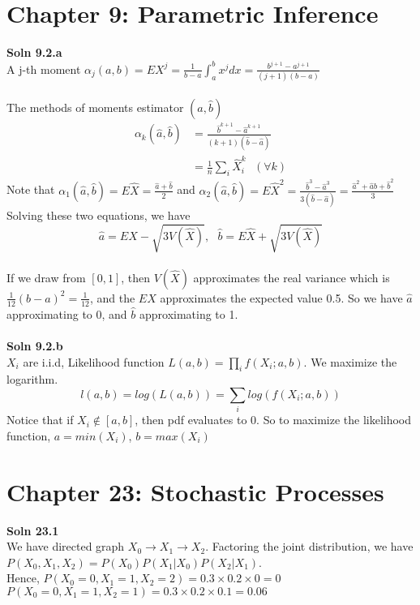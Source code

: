 \documentclass{article}
\newcommand{\SOL}[2]{%
  \textbf{Soln #1}\\%
}
\begin{document}
\section*{Chapter 9: Parametric Inference}
\SOL{9.2.a}
\\
A j-th moment $\alpha_j (a, b) = EX^j = \frac{1}{b-a}\int^b_a x^j dx = \frac{b^{j+1} - a^{j+1}}{(j+1)(b-a)}$ \\ \\
The methods of moments estimator $(\hat{a}, \hat{b})$
\begin{align*}
	\alpha_k (\hat{a}, \hat{b})&= \frac{\hat{b}^{k+1} - \hat{a}^{k+1}}{(k+1)(\hat{b} - \hat{a})} \\
	 &= \frac{1}{n} \sum_i \hat{X}^k_i \ \ \ (\forall k)
\end{align*}
Note that $\alpha_1(\hat{a}, \hat{b}) = E\hat{X}  = \frac{\hat{a}+\hat{b}}{2}$  and $\alpha_2(\hat{a}, \hat{b}) = E\hat{X}^2 = \frac{\hat{b}^3 - \hat{a}^3}{3(\hat{b} - \hat{a})} = \frac{\hat{a}^2 + \hat{a}\hat{b} + \hat{b}^2}{3}$ \\
Solving these two equations, we have  
$$
  \hat{a} = E\hat{X} - \sqrt{3V(\hat{X})}, \ \ \ \hat{b} = E\hat{X} +  \sqrt{3V(\hat{X})}
$$ \\
If we draw from $[0, 1]$, then $V(\hat{X})$ approximates the real variance which is $\frac{1}{12}(b - a)^2 = \frac{1}{12}$, and the $E\hat{X}$ approximates the expected value 0.5. So we have $\hat{a}$ approximating to 0, and $\hat{b}$ approximating to 1. \\ \\ 
\SOL{9.2.b}
\\
$X_i$ are i.i.d,  Likelihood function $L(a,b) = \prod_i f(X_i;a,b)$. We maximize the logarithm. \\
$$ l(a,b) = log(L(a,b)) = \sum_i log(f(X_i;a,b))$$
Notice that if $X_i \not\in [a, b]$, then pdf evaluates to 0. So to maximize the likelihood function,  $ a = min(X_i)$, $b=max(X_i)$

\section*{Chapter 23: Stochastic Processes}
\SOL{23.1} \\
We have directed graph $X_0 \rightarrow X_1 \rightarrow X_2$. Factoring the joint distribution, we have $P(X_0, X_1, X_2) = P(X_0) P(X_1|X_0)P(X_2|X_1)$. \\
Hence, $P(X_0=0, X_1=1, X_2 = 2) = 0.3\times 0.2 \times 0 = 0$ \\
$P(X_0=0, X_1=1, X_2 = 1) = 0.3 \times 0.2 \times 0.1 = 0.06$ \\
\end{document}
